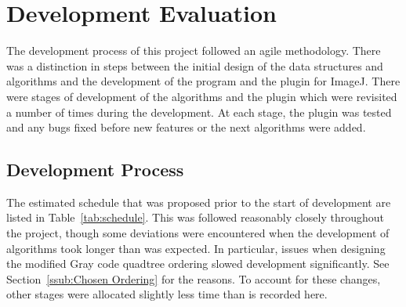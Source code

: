 
\section{Development Evaluation}
\label{sec:development_evaluation}

The development process of this project followed an agile methodology. There
was a distinction in steps between the initial design of the data structures
and algorithms and the development of the program and the plugin for ImageJ.
There were stages of development of the algorithms and the plugin which were
revisited a number of times during the development. At each stage, the plugin
was tested and any bugs fixed before new features or the next algorithms were
added.

\subsection{Development Process}
\label{sub:development_process}

The estimated schedule that was proposed prior to the start of development are
listed in Table~\ref{tab:schedule}. This was followed reasonably closely
throughout the project, though some deviations were encountered when the
development of algorithms took longer than was expected. In particular, issues
when designing the modified Gray code quadtree ordering slowed development
significantly. See Section~\ref{ssub:Chosen Ordering} for the reasons. To
account for these changes, other stages were allocated slightly less time than
is recorded here.

